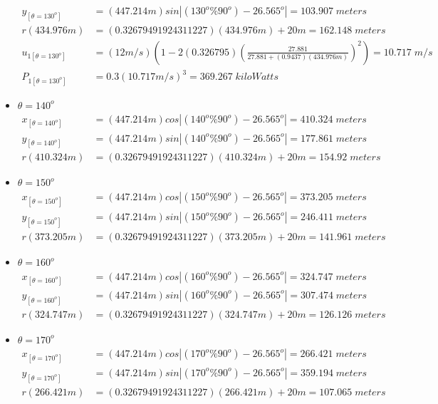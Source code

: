 \begin{itemize}
\begin{align*}
		y_{[\theta=130^o]} &=(447.214m) sin\left| (130^o\%90^o) - 26.565^o \right|  =103.907\;meters \\
		r(434.976m) &=(0.32679491924311227)(434.976m)+20m  =162.148\;meters\\
		u_{1[\theta=130^o]} &=(12m/s)\left( 1-2(0.326795)\left( \frac{27.881}{27.881+(0.9437)(434.976m)} \right)^2 \right) =10.717\;m/s \\
		P_{1[\theta=130^o]} &=0.3(10.717m/s)^3  =369.267\;kiloWatts
\end{align*}
\item $\theta=140^o$
	\begin{align*}%
		x_{[\theta=140^o]} &=(447.214m) cos\left| (140^o\%90^o) - 26.565^o \right|  =410.324\;meters \\
		y_{[\theta=140^o]} &=(447.214m) sin\left| (140^o\%90^o) - 26.565^o \right|  =177.861\;meters \\
		r(410.324m) &=(0.32679491924311227)(410.324m)+20m  =154.92\;meters\end{align*}
\item $\theta=150^o$
	\begin{align*}%
		x_{[\theta=150^o]} &=(447.214m) cos\left| (150^o\%90^o) - 26.565^o \right|  =373.205\;meters \\
		y_{[\theta=150^o]} &=(447.214m) sin\left| (150^o\%90^o) - 26.565^o \right|  =246.411\;meters \\
		r(373.205m) &=(0.32679491924311227)(373.205m)+20m  =141.961\;meters\end{align*}
\item $\theta=160^o$
	\begin{align*}%
		x_{[\theta=160^o]} &=(447.214m) cos\left| (160^o\%90^o) - 26.565^o \right|  =324.747\;meters \\
		y_{[\theta=160^o]} &=(447.214m) sin\left| (160^o\%90^o) - 26.565^o \right|  =307.474\;meters \\
		r(324.747m) &=(0.32679491924311227)(324.747m)+20m  =126.126\;meters\end{align*}
\item $\theta=170^o$
	\begin{align*}%
		x_{[\theta=170^o]} &=(447.214m) cos\left| (170^o\%90^o) - 26.565^o \right|  =266.421\;meters \\
		y_{[\theta=170^o]} &=(447.214m) sin\left| (170^o\%90^o) - 26.565^o \right|  =359.194\;meters \\
		r(266.421m) &=(0.32679491924311227)(266.421m)+20m  =107.065\;meters\end{align*}
    \end{itemize}
    
